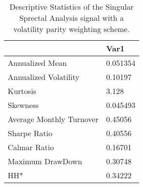 \begin{table}[H]
\centering
\begin{tabular}{ll}
& Var1 \\ 
\hline 
Annualized Mean & 0.051354 \\ 
Annualized Volatility & 0.10197 \\ 
Kurtosis & 3.128 \\ 
Skewness & 0.045493 \\ 
Average Monthly Turnover & 0.45056 \\ 
Sharpe Ratio & 0.40556 \\ 
Calmar Ratio & 0.16701 \\ 
Maximum DrawDown & 0.30748 \\ 
HH* & 0.34222 \\ 
\hline
\end{tabular}
\caption{Descriptive Statistics of the Singular Sprectal Analysis signal with a volatility parity weighting scheme.}
\label{SSA}
\end{table}